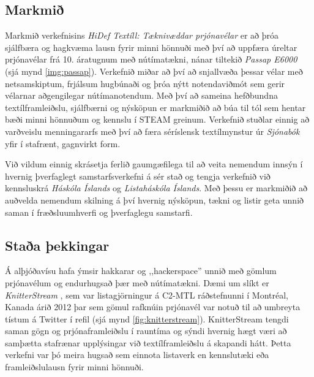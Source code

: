 \documentclass[a4paper,12pt,twoside]{article}
\begin{document}
\subsection{Markmið}
Markmið verkefnisins \emph{HiDef Textíll: Tæknivæddar prjónavélar} er að þróa sjálfbæra og hagkvæma lausn fyrir minni hönnuði með því að uppfæra úreltar prjónavélar frá 10. áratugnum með nútímatækni, nánar tiltekið \textit{Passap E6000} (sjá mynd \ref{img:passap}). Verkefnið miðar að því að snjallvæða þessar vélar með netsamskiptum, frjálsum hugbúnaði og þróa nýtt notendaviðmót sem gerir vélarnar aðgengilegar nútímanotendum. Með því að sameina hefðbundna textílframleiðslu, sjálfbærni og nýsköpun er markmiðið að búa til tól sem hentar bæði minni hönnuðum og kennslu í STEAM greinum. Verkefnið stuðlar einnig að varðveislu menningararfs með því að færa sér\-íslensk textílmynstur úr \emph{Sjónabók} yfir í staf\-rænt, gagnvirkt form.

Við vildum einnig skrásetja ferlið gaumgæfilega til að veita nemendum innsýn í hvernig þverfaglegt samstarfsverkefni á sér stað og tengja verkefnið við kennsluskrá \emph{Háskóla Íslands} og \emph{Listaháskóla Íslands}. Með þessu er markmiðið að auðvelda nemendum skilning á því hvernig nýsköpun, tækni og listir geta unnið saman í fræðsluumhverfi og þverfaglegu samstarfi.

\subsection{Staða þekkingar}

Á alþjóðavísu hafa ýmsir hakkarar og ,,hackerspace'' unnið með gömlum prjónavélum og endurhugsað þær með nútímatækni. Dæmi um slíkt er \emph{KnitterStream} \cite{knitterstream}, sem var listagjörningur á C2-MTL ráðstefnunni í Montréal, Kanada árið 2012 þar sem gömul rafknúin prjónavél var notuð til að umbreyta tístum á Twitter í refil (sjá mynd \ref{fig:knitterstream}). KnitterStream tengdi saman gögn og prjónaframleiðslu í rauntíma og sýndi hvernig hægt væri að samþætta stafrænar upplýsingar við textílframleiðslu á skapandi hátt. Þetta verkefni var þó meira hugsað sem einnota listaverk en kennslutæki eða framleiðslulausn fyrir minni hönnuði.
\end{document}

